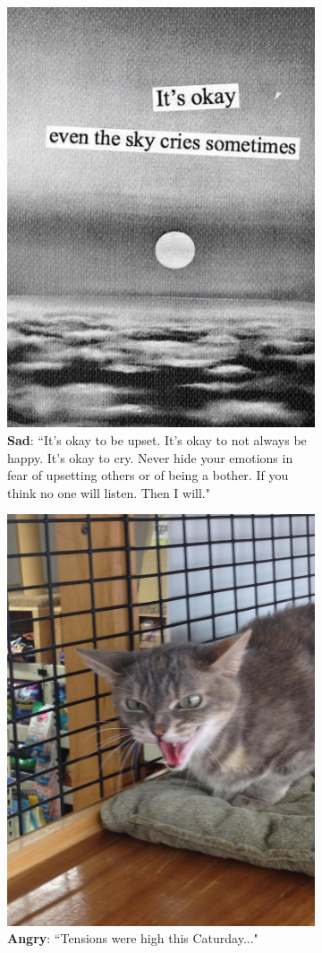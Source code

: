 \begin{figure}
\begin{subfigure}[t]{.5\textwidth}
  \includegraphics[width=.6\linewidth]{Images/sad.jpg}
  \caption{\textbf{Sad}: ``It's okay to be upset. It's okay to not always be happy. It's okay to cry. Never hide your emotions in fear of upsetting others or of being a bother.   If you think no one will listen. Then I will."}
\end{subfigure}
\begin{subfigure}[t]{.5\textwidth}
  \vskip 0pt 
  \centering
  \includegraphics[width=.5\linewidth]{Images/angry.jpg}
  \caption{\textbf{Angry}: ``Tensions were high this Caturday..."}
\end{subfigure}
\begin{subfigure}[t]{.5\textwidth}
  \vskip 0pt 
  \centering

\end{subfigure}
\end{figure}
